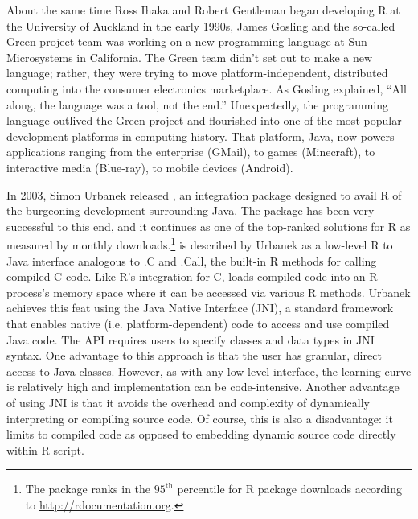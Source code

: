 
About the same time Ross Ihaka and Robert Gentleman began developing R at the University of Auckland in the early 1990s, James Gosling and the so-called Green project team was working on a new programming language at Sun Microsystems in California. The Green team didn't set out to make a new language; rather, they were trying to move platform-independent, distributed computing into the consumer electronics marketplace. As Gosling explained, ``All along, the language was a tool, not the end.'' Unexpectedly, the programming language outlived the Green project and flourished into one of the most popular development platforms in computing history. That platform, Java, now powers applications ranging from the enterprise (GMail), to games (Minecraft), to interactive media (Blue-ray), to mobile devices (Android).

In 2003, Simon Urbanek released , an integration package designed to avail R of the burgeoning development surrounding Java. The package has been very successful to this end, and it continues as one of the top-ranked solutions for R as measured by monthly downloads.\footnote{The  package ranks in the $95^{\text{th}}$ percentile for R package downloads according to \href{http://rdocumentation.org}{http://rdocumentation.org}.}  is described by Urbanek as a low-level R to Java interface analogous to .C and .Call, the built-in R methods for calling compiled C code. Like R's integration for C,  loads compiled code into an R process's memory space where it can be accessed via various R methods. Urbanek achieves this feat using the Java Native Interface (JNI), a standard framework that enables native (i.e. platform-dependent) code to access and use compiled Java code. The  API requires users to specify classes and data types in JNI syntax. One advantage to this approach is that the user has granular, direct access to Java classes. However, as with any low-level interface, the learning curve is relatively high and implementation can be code-intensive. Another advantage of using JNI is that it avoids the overhead and complexity of dynamically interpreting or compiling source code. Of course, this is also a disadvantage: it limits  to compiled code as opposed to embedding dynamic source code directly within R script.

